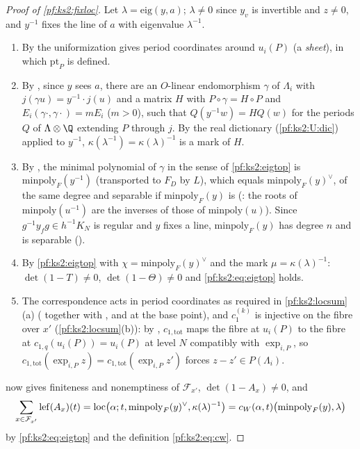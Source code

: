 \begin{proof}[Proof of \cref{pf:ks2:fixloc}]
Let $\lambda=\mathrm{eig}(y,a)$; $\lambda\ne0$ since $y_v$ is
invertible and $z\ne0$, and $y^{-1}$ fixes the line of $a$ with eigenvalue $\lambda^{-1}$.
\begin{enumerate}
\item By  the uniformization gives period coordinates around
  $u_i(P)$ (a \emph{sheet}), in which $\mathrm{pt}_P$ is defined.
\item By , since $y$ sees $a$, there are an $O$-linear
  endomorphism $\gamma$ of $\Lambda_i$ with $j(\gamma u)=y^{-1}\cdot j(u)$ and a matrix $H$ with
  $P\circ\gamma=H\circ P$ and $E_i(\gamma\cdot,\gamma\cdot)=mE_i$ ($m>0$), such that $Q(y^{-1}w)=HQ(w)$ for the
  periods $Q$ of $\Lambda\otimes\Q$ extending $P$ through $j$. By the real dictionary
  (\ref{pf:ks2:U:dic}) applied to $y^{-1}$, $\kappa(\lambda^{-1})=\kappa(\lambda)^{-1}$ is a mark of $H$.
\item By , the minimal polynomial of $\gamma$ in the sense of
  \cref{pf:ks2:eigtop} is $\mathrm{minpoly}_F(y^{-1})$ (transported to $F_D$ by $L$), which equals
  $\mathrm{minpoly}_F(y)^\vee$, of the same degree and separable if $\mathrm{minpoly}_F(y)$ is
  (: the roots of $\mathrm{minpoly}(u^{-1})$ are the inverses of
  those of $\mathrm{minpoly}(u)$). Since $g^{-1}y_fg\in h^{-1}K_N$ is regular and $y$ fixes a line,
  $\mathrm{minpoly}_F(y)$ has degree $n$ and is separable ().
\item By \cref{pf:ks2:eigtop} with $\chi=\mathrm{minpoly}_F(y)^\vee$ and the mark $\mu=\kappa(\lambda)^{-1}$:
  $\det(1-T)\ne0$, $\det(1-\Theta)\ne0$ and \eqref{pf:ks2:eq:eigtop} holds.
\item The correspondence acts in period coordinates as required in \cref{pf:ks2:locsum}(a)
  ( together with , and
   at the base point), and $c_1^{(k)}$ is injective on the fibre
  over $x'$ (\cref{pf:ks2:locsum}(b)): by , $c_{1,\mathrm{tot}}$ maps
  the fibre at $u_i(P)$ to the fibre at $c_{1,q}(u_i(P))=u_i(P)$ at level $N$ compatibly with $\exp_{i,P}$, so
  $c_{1,\mathrm{tot}}(\exp_{i,P}z)=c_{1,\mathrm{tot}}(\exp_{i,P}z')$ forces $z-z'\in P(\Lambda_i)$.
\end{enumerate}
 now gives finiteness and nonemptiness of $\mathcal F_{x'}$, $\det(1-A_x)\ne0$, and
\[
\sum_{x\in\mathcal F_{x'}}\mathrm{lef}(A_x)(t)=\mathrm{loc}\bigl(\alpha;t,\mathrm{minpoly}_F(y)^\vee,\kappa(\lambda)^{-1}\bigr)
=c_W(\alpha,t)\bigl(\mathrm{minpoly}_F(y),\lambda\bigr)
\]
by \eqref{pf:ks2:eq:eigtop} and the definition \eqref{pf:ks2:eq:cw}.
\end{proof}

